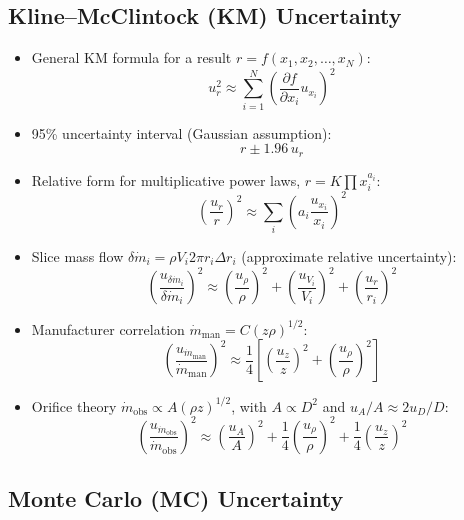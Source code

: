 \documentclass[11pt]{article}
\begin{document}
\subsection*{Kline–McClintock (KM) Uncertainty}

\begin{itemize}
  \item General KM formula for a result
    \( r = f(x_1,x_2,\dots,x_N) \):
    $$
      u_r^2 \approx
      \sum_{i=1}^{N}
      \left(
        \frac{\partial f}{\partial x_i} u_{x_i}
      \right)^2
    $$
  \item 95\% uncertainty interval (Gaussian assumption):
    $$
      r \pm 1.96\,u_r
    $$
  \item Relative form for multiplicative power laws,
    \( r = K \prod x_i^{a_i} \):
    $$
      \left(\frac{u_r}{r}\right)^2
      \approx
      \sum_i
      \left(
        a_i \frac{u_{x_i}}{x_i}
      \right)^2
    $$
  \item Slice mass flow
    \( \delta \dot m_i = \rho V_i 2\pi r_i \Delta r_i \)
    (approximate relative uncertainty):
    $$
      \left(
        \frac{u_{\delta \dot m_i}}{\delta \dot m_i}
      \right)^2
      \approx
      \left(\frac{u_\rho}{\rho}\right)^2
      +
      \left(\frac{u_{V_i}}{V_i}\right)^2
      +
      \left(\frac{u_r}{r_i}\right)^2
    $$
  \item Manufacturer correlation
    \( \dot m_{\text{man}} = C (z\rho)^{1/2} \):
    $$
      \left(
        \frac{u_{\dot m_{\text{man}}}}{\dot m_{\text{man}}}
      \right)^2
      \approx
      \frac{1}{4}
      \left[
        \left(\frac{u_z}{z}\right)^2
        +
        \left(\frac{u_\rho}{\rho}\right)^2
      \right]
    $$
  \item Orifice theory
    \( \dot m_{\text{obs}} \propto A (\rho z)^{1/2} \),
    with \( A \propto D^2 \) and \( u_A/A \approx 2 u_D/D \):
    $$
      \left(
        \frac{u_{\dot m_{\text{obs}}}}{\dot m_{\text{obs}}}
      \right)^2
      \approx
      \left(\frac{u_A}{A}\right)^2
      +
      \frac{1}{4}\left(\frac{u_\rho}{\rho}\right)^2
      +
      \frac{1}{4}\left(\frac{u_z}{z}\right)^2
    $$
\end{itemize}

\subsection*{Monte Carlo (MC) Uncertainty}
\end{document}
